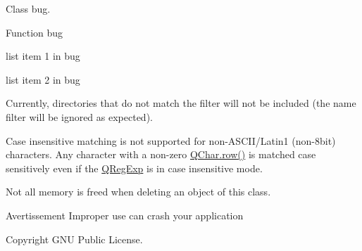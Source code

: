 
\begin{DoxyRefList}
\item[\label{bug__bug000004}%
\hypertarget{bug__bug000004}{}%
Classe \hyperlink{class_bug}{Bug} ]Class bug.  
\item[\label{bug__bug000005}%
\hypertarget{bug__bug000005}{}%
Membre \hyperlink{class_bug_a1f720954dd97cd1203e80501a6eae74c}{Bug\+:\+:foo} ()]Function bug
\begin{DoxyItemize}
\item list item 1 in bug
\item list item 2 in bug 
\end{DoxyItemize}
\item[\label{bug__bug000002}%
\hypertarget{bug__bug000002}{}%
Membre \hyperlink{class_q_dir_aec96bf79103196eefd2a38ff74aeadd0}{Q\+Dir\+:\+:set\+Match\+All\+Dirs} (bool)]Currently, directories that do not match the filter will not be included (the name filter will be ignored as expected). 
\item[\label{bug__bug000003}%
\hypertarget{bug__bug000003}{}%
Classe \hyperlink{class_q_reg_exp}{Q\+Reg\+Exp} ]Case insensitive matching is not supported for non-\/\+A\+S\+C\+I\+I/\+Latin1 (non-\/8bit) characters. Any character with a non-\/zero \hyperlink{class_q_char_a8f987c65692f95eebc84bf687ea92aff}{Q\+Char.\+row()} is matched case sensitively even if the \hyperlink{class_q_reg_exp}{Q\+Reg\+Exp} is in case insensitive mode. 
\item[\label{bug__bug000001}%
\hypertarget{bug__bug000001}{}%
Classe \hyperlink{class_some_nice_class}{Some\+Nice\+Class} ]Not all memory is freed when deleting an object of this class. \begin{DoxyWarning}{Avertissement}
Improper use can crash your application 
\end{DoxyWarning}
\begin{DoxyCopyright}{Copyright}
G\+N\+U Public License. 
\end{DoxyCopyright}

\end{DoxyRefList}